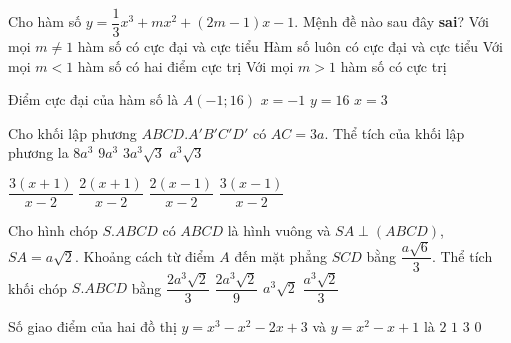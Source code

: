 \begin{ex}%
Cho hàm số $y=\dfrac{1}{3}x^3+mx^2+(2m-1)x-1$. Mệnh đề nào sau đây {\bf sai}?
\choice
{ Với mọi $m \ne 1$ hàm số có cực đại và cực tiểu}
{\True Hàm số luôn có cực đại và cực tiểu}
{ Với mọi $m<1$ hàm số có hai điểm cực trị}
{  Với mọi $m>1$ hàm số có cực trị}
\end{ex}
\begin{ex}%
Điểm cực đại của hàm số là
\choice
{ $A(-1;16)$}
{\True $x=-1$}
{ $y=16$}
{   $x=3$}
\end{ex}
\begin{ex}%
Cho khối lập phương $ABCD.A'B'C'D'$ có $AC=3a$. Thể tích của khối lập phương la
\choice
{ $8a^3$}
{ $9a^3$}
{\True  $3a^3\sqrt{3}$}
{   $a^3\sqrt{3}$}
\end{ex}
\begin{ex}%
\choice
{ \True $\dfrac{3(x+1)}{x-2}$}
{ $\dfrac{2(x+1)}{x-2}$}
{ $\dfrac{2(x-1)}{x-2}$}
{   $\dfrac{3(x-1)}{x-2}$}
\end{ex}
\begin{ex}%
Cho hình chóp $S.ABCD$ có $ABCD$ là hình vuông và $SA \perp (ABCD)$, $SA=a\sqrt{2}$. Khoảng cách từ điểm $A$ đến mặt phẳng $SCD$ bằng $\dfrac{a\sqrt{6}}{3}$. Thể tích khối chóp $S.ABCD$ bằng
\choice
{ $\dfrac{2a^3\sqrt{2}}{3}$}
{ $\dfrac{2a^3\sqrt{2}}{9}$}
{ $a^3\sqrt{2}$}
{ \True  $\dfrac{a^3\sqrt{2}}{3}$}
\end{ex}
\begin{ex}%
Số giao điểm của hai đồ thị $y=x^3-x^2-2x+3$ và $y=x^2-x+1$ là
\choice
{ $2$}
{ $1$}
{\True $3$}
{   $0$}
\end{ex}
